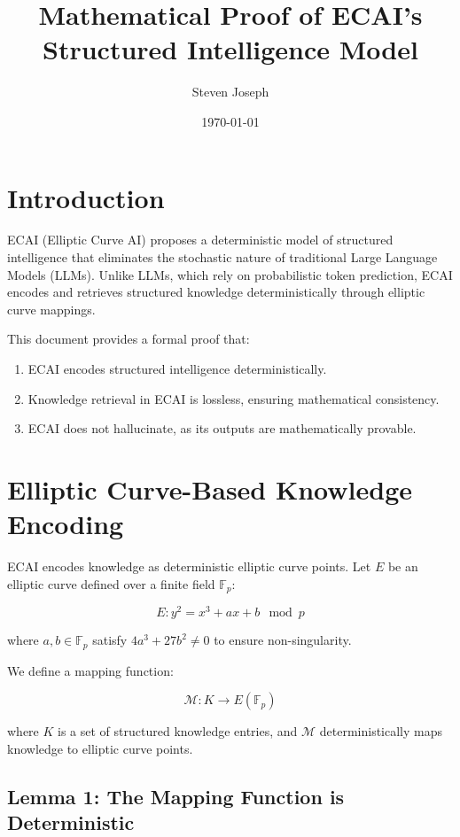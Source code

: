 \documentclass{article}
\title{Mathematical Proof of ECAI's Structured Intelligence Model}
\author{Steven Joseph}
\date{\today}
\begin{document}
\maketitle

\section{Introduction}
ECAI (Elliptic Curve AI) proposes a deterministic model of structured intelligence that eliminates the stochastic nature of traditional Large Language Models (LLMs). Unlike LLMs, which rely on probabilistic token prediction, ECAI encodes and retrieves structured knowledge deterministically through elliptic curve mappings.

This document provides a formal proof that:
\begin{enumerate}
    \item ECAI encodes structured intelligence deterministically.
    \item Knowledge retrieval in ECAI is lossless, ensuring mathematical consistency.
    \item ECAI does not hallucinate, as its outputs are mathematically provable.
\end{enumerate}

\section{Elliptic Curve-Based Knowledge Encoding}

ECAI encodes knowledge as deterministic elliptic curve points. Let $E$ be an elliptic curve defined over a finite field $\mathbb{F}_p$:

\begin{equation}
E: y^2 = x^3 + ax + b \mod p
\end{equation}

where $a, b \in \mathbb{F}_p$ satisfy $4a^3 + 27b^2 \neq 0$ to ensure non-singularity.

We define a mapping function:

\begin{equation}
\mathcal{M}: K \to E(\mathbb{F}_p)
\end{equation}

where $K$ is a set of structured knowledge entries, and $\mathcal{M}$ deterministically maps knowledge to elliptic curve points.

\subsection{Lemma 1: The Mapping Function is Deterministic}
\end{document}
